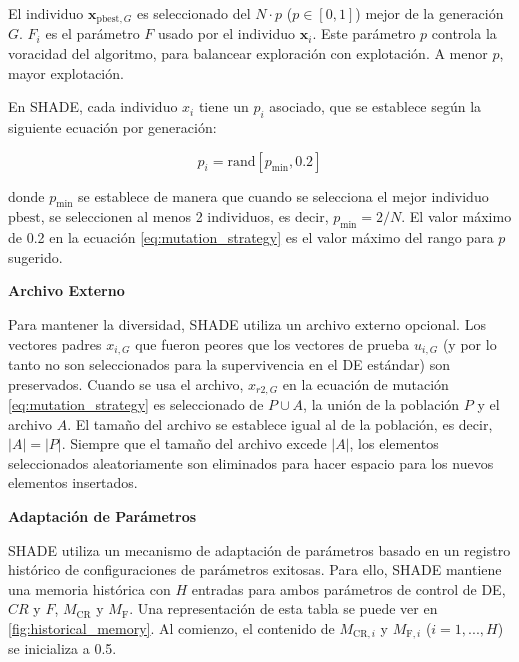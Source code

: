 \noindent El individuo \( \mathbf{x}_{\text{pbest},G} \) es seleccionado del \( N \cdot p \) (\( p \in [0, 1] \)) mejor de la generación \( G \). \( F_i \) es el parámetro \( F \) usado por el individuo \( \mathbf{x}_i \). Este parámetro \( p \) controla la voracidad del algoritmo, para balancear exploración con explotación. A menor \( p \), mayor explotación.

\vspace{10px}

\noindent En SHADE, cada individuo \(x_i\) tiene un \(p_i\) asociado, que se establece según la siguiente ecuación por generación:

\begin{equation}
p_i = \text{rand}[p_{\min}, 0.2]
\end{equation}

\noindent donde \(p_{\min}\) se establece de manera que cuando se selecciona el mejor individuo \(\text{pbest}\), se seleccionen al menos 2 individuos, es decir, \(p_{\min} = 2/N\). El valor máximo de 0.2 en la ecuación \ref{eq:mutation_strategy} es el valor máximo del rango para \(p\) sugerido.

\vspace{10px}

\noindent\textbf{Archivo Externo}

Para mantener la diversidad, SHADE utiliza un archivo externo opcional. Los vectores padres \(x_{i,G}\) que fueron peores que los vectores de prueba \(u_{i,G}\) (y por lo tanto no son seleccionados para la supervivencia en el DE estándar) son preservados. Cuando se usa el archivo, \(x_{r2,G}\) en la ecuación de mutación \ref{eq:mutation_strategy} es seleccionado de \(P \cup A\), la unión de la población \(P\) y el archivo \(A\). El tamaño del archivo se establece igual al de la población, es decir, \(|A| = |P|\). Siempre que el tamaño del archivo excede \(|A|\), los elementos seleccionados aleatoriamente son eliminados para hacer espacio para los nuevos elementos insertados.

\vspace{10px}

\noindent\textbf{Adaptación de Parámetros}

SHADE utiliza un mecanismo de adaptación de parámetros basado en un registro histórico de configuraciones de parámetros exitosas. Para ello, SHADE mantiene una memoria histórica con \(H\) entradas para ambos parámetros de control de DE, \(CR\) y \(F\), \(M_{\text{CR}}\) y \(M_{\text{F}}\). Una representación de esta tabla se puede ver en \ref{fig:historical_memory}. Al comienzo, el contenido de \(M_{\text{CR},i}\) y \(M_{\text{F},i}\) (\(i = 1, ..., H\)) se inicializa a 0.5.

